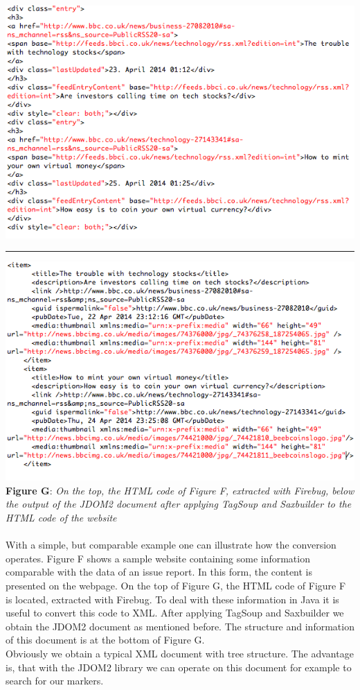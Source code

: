 \\\includegraphics[width=\textwidth]{html_ausschnitt.png} \\ \hrule \includegraphics[width=1.0\textwidth]{xml_ausschnitt.png}  \\\textbf{Figure G}: \textit{On the top, the HTML code of Figure F, extracted with Firebug, below the output of the JDOM2 document after applying TagSoup and Saxbuilder to the HTML code of the website}  \\ \\ \newpage With a simple, but comparable example one can illustrate how the conversion operates. Figure F shows a sample website containing some information comparable with the data of an issue report. In this form, the content is presented on the webpage. On the top of Figure G, the HTML code of Figure F is located, extracted with Firebug. To deal with these information in Java it is useful to convert this code to XML. After applying TagSoup and Saxbuilder we obtain the JDOM2 document as mentioned before. The structure and information of this document is at the bottom of Figure G.\\ Obviously we obtain a typical XML document with tree structure. The advantage is, that with the JDOM2 library we can operate on this document for example to search for our markers. 


